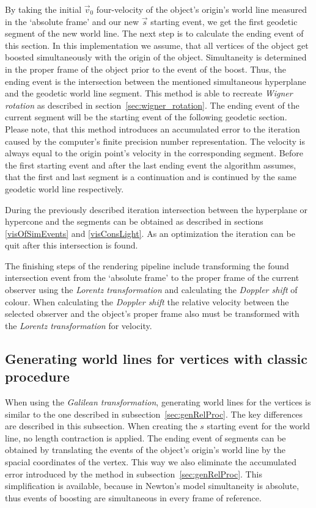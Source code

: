 \documentclass{egpubl}
\begin{document}
By taking the initial $\vec{v}_0$ four-velocity of the object's origin's world line measured in the `absolute frame' and our new $\vec{s}$ starting event, we get the first geodetic segment of the new world line. The next step is to calculate the ending event of this section. In this implementation we assume, that all vertices of the object get boosted simultaneously with the origin of the object. Simultaneity is determined in the proper frame of the object prior to the event of the boost. Thus, the ending event is the intersection between the mentioned simultaneous hyperplane and the geodetic world line segment. This method is able to recreate \emph{Wigner rotation} as described in section~\ref{sec:wigner_rotation}. The ending event of the current segment will be the starting event of the following geodetic section. Please note, that this method introduces an accumulated error to the iteration caused by the computer's finite precision number representation. The velocity is always equal to the origin point's velocity in the corresponding segment. Before the first starting event and after the last ending event the algorithm assumes, that the first  and last segment is a continuation and is continued by the same geodetic world line respectively.

During the previously described iteration intersection between the hyperplane or hypercone and the segments can be obtained as described in sections \ref{visOfSimEvents} and \ref{visConsLight}. As an optimization the iteration can be quit after this intersection is found.

The finishing steps of the rendering pipeline include transforming the found intersection event from the `absolute frame' to the proper frame of the current observer using the \emph{Lorentz transformation} and calculating the \emph{Doppler shift} of colour. When calculating the \emph{Doppler shift} the relative velocity between the selected observer and the object's proper frame also must be transformed with the \emph{Lorentz transformation} for velocity.

\subsection{Generating world lines for vertices with classic procedure}
When using the \emph{Galilean transformation}, generating world lines for the vertices is similar to the one described in subsection~\ref{sec:genRelProc}. The key differences are described in this subsection. When creating the $s$ starting event for the world line, no length contraction is applied. The ending event of segments can be obtained by translating the events of the object's origin's world line by the spacial coordinates of the vertex. This way we also eliminate the accumulated error introduced by the method in subsection~\ref{sec:genRelProc}. This simplification is available, because in Newton's model simultaneity is absolute, thus events of boosting are simultaneous in every frame of reference.
\end{document}
